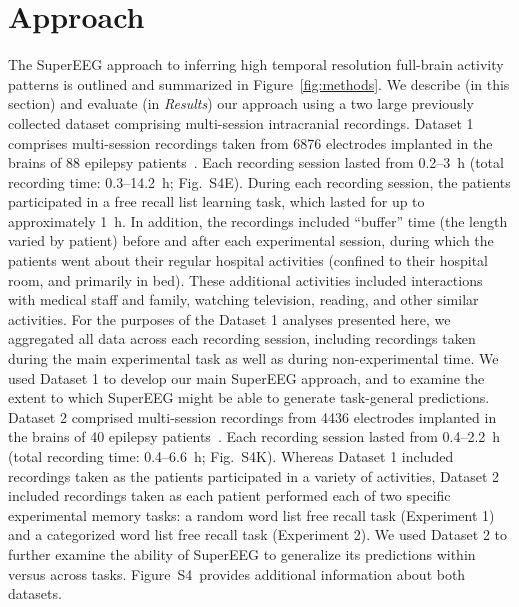\documentclass[11pt]{article}
\newcommand{\suppstats}{S4}
\begin{document}
\section*{Approach}
The SuperEEG approach to inferring high temporal resolution full-brain
activity patterns is outlined and summarized in
Figure~\ref{fig:methods}. We describe (in this section) and evaluate
(in \textit{Results}) our approach using a two large previously
collected dataset comprising multi-session intracranial recordings.
Dataset 1 comprises multi-session recordings taken from 6876
electrodes implanted in the brains of 88 epilepsy
patients~\cite{SedeEtal03, SedeEtal07a, SedeEtal07b, MannEtal11,
  MannEtal12}.  Each recording session lasted from 0.2--3~h (total
recording time: 0.3--14.2~h; Fig.~\suppstats E).  During each
recording session, the patients participated in a free recall list
learning task, which lasted for up to approximately 1~h.  In addition,
the recordings included ``buffer'' time (the length varied by patient)
before and after each experimental session, during which the patients
went about their regular hospital activities (confined to their
hospital room, and primarily in bed).  These additional activities
included interactions with medical staff and family, watching
television, reading, and other similar activities.  For the purposes
of the Dataset 1 analyses presented here, we aggregated all data
across each recording session, including recordings taken during the
main experimental task as well as during non-experimental time.  We
used Dataset 1 to develop our main SuperEEG approach, and to examine
the extent to which SuperEEG might be able to generate task-general
predictions.  Dataset 2 comprised multi-session recordings from 4436
electrodes implanted in the brains of 40 epilepsy
patients~\citep{EzzyEtal17, HoraEtal17, KragEtal17, KuceEtal17,
  LinEtal17, SoloEtal18, WeidEtal18, EzzyEtal18, KuceEtal18}.  Each
recording session lasted from 0.4--2.2~h (total recording time:
0.4--6.6~h; Fig.~\suppstats K).  Whereas Dataset 1 included recordings
taken as the patients participated in a variety of activities, Dataset
2 included recordings taken as each patient performed each of two
specific experimental memory tasks: a random word list free recall
task (Experiment 1) and a categorized word list free recall task
(Experiment 2).  We used Dataset 2
to further examine the ability of SuperEEG to generalize its
predictions within versus across tasks.  Figure~\suppstats~provides
additional information about both datasets.
\end{document}
